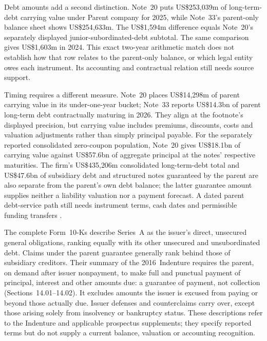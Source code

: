Debt amounts add a second distinction. Note~20 puts US\$253{,}039m of
long-term-debt carrying value under Parent company for 2025, while Note~33's
parent-only balance sheet shows US\$254{,}633m. The US\$1{,}594m difference
equals Note~20's separately displayed junior-subordinated-debt subtotal. The
same comparison gives US\$1{,}603m in 2024. This exact two-year arithmetic
match does not establish how that row relates to the parent-only balance,
or which legal entity owes each instrument. Its accounting and
contractual relation still needs source support.

Timing requires a different measure. Note~20 places US\$14{,}298m of parent
carrying value in its under-one-year bucket; Note~33 reports US\$14.3bn of
parent long-term debt contractually maturing in 2026. They align at the
footnote's displayed precision, but carrying value includes premiums,
discounts, costs and valuation adjustments rather than simply principal
payable. For the separately reported consolidated zero-coupon population,
Note~20 gives US\$18.1bn of carrying value against US\$57.6bn of aggregate
principal at the notes' respective maturities. The firm's US\$435{,}206m
consolidated long-term-debt total and US\$47.6bn of subsidiary debt and
structured notes guaranteed by the parent are also separate from the parent's
own debt balance; the latter guarantee amount supplies neither a liability
valuation nor a payment forecast. A dated parent debt-service path still needs
instrument terms, cash dates and permissible funding transfers
\citep[pp.~281--282, 310--311]{jpmorgan2025tenk}.

\newpage

The complete Form~10-Ks describe Series~A as the issuer's direct, unsecured
general obligations, ranking equally with its other unsecured and
unsubordinated debt. Claims under the parent guarantee generally rank behind
those of subsidiary creditors. Their summary of the 2016~Indenture requires
the parent, on demand after issuer nonpayment, to make full and punctual
payment of principal, interest and other amounts due: a guarantee of payment,
not collection
(Sections~14.01--14.02). It excludes amounts the issuer is excused from paying
or beyond those actually due. Issuer defenses and counterclaims carry over,
except those arising solely from insolvency or bankruptcy status. These
descriptions refer to the Indenture and applicable prospectus supplements;
they specify reported terms but do not supply a current balance, valuation or
accounting recognition.


